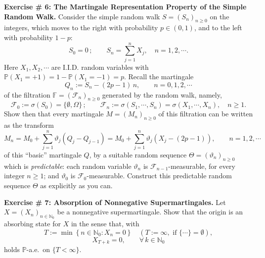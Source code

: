 \textbf{Exercise \# 6: The Martingale Representation Property of the Simple Random Walk.} Consider the simple random walk $S = \left(S_n\right)_{n \geq 0}$ on the integers, which moves to the right with probability $p \in (0,1)$, and to the left with probability $1-p$:
\[
    S_0 = 0\,; \qquad S_n = \sum_{j=1}^{n} X_j, \quad n = 1, 2, \cdots.
\]
Here $X_1, X_2, \cdots$ are I.I.D. random variables with $\mathbb{P}(X_1 = +1) = 1 - \mathbb{P}(X_1 = -1) = p$. Recall the martingale
\[
    Q_n := S_n - (2p-1)\,n, \qquad n = 0, 1, 2, \cdots
\]
of the filtration $\mathbb{F} = \left(\mathcal{F}_n\right)_{n \geq 0}$ generated by the random walk, namely,
\[
    \mathcal{F}_0 := \sigma(S_0) = \{\emptyset, \Omega\}\,; \qquad \mathcal{F}_n := \sigma(S_1, \cdots, S_n) = \sigma(X_1, \cdots, X_n), \quad n \geq 1.
\]
Show then that every martingale $M = \left(M_n\right)_{n \geq 0}$ of this filtration can be written as the transform
\[
    M_n = M_0 + \sum_{j=1}^{n} \vartheta_j\left(Q_j - Q_{j-1}\right) = M_0 + \sum_{j=1}^{n} \vartheta_j\left(X_j - (2p-1)\right), \qquad n = 1, 2, \cdots
\]
of this ``basic'' martingale $Q$, by a suitable random sequence $\Theta = \left(\vartheta_n\right)_{n \geq 0}$ which is \textit{predictable}: each random variable $\vartheta_n$ is $\mathcal{F}_{n-1}$-measurable, for every integer $n \geq 1$; and $\vartheta_0$ is $\mathcal{F}_0$-measurable. Construct this predictable random sequence $\Theta$ as explicitly as you can.

\textbf{Exercise \# 7: Absorption of Nonnegative Supermartingales.} Let $X = \left(X_n\right)_{n \in \mathbb{N}_0}$ be a nonnegative supermartingale. Show that the origin is an absorbing state for $X$ in the sense that, with
\[
    T := \min\left\{n \in \mathbb{N}_0 : X_n = 0\right\} \quad \left(T := \infty, \text{ if } \{\cdots\} = \emptyset\right),
\]
\[
    X_{T+k} = 0, \qquad \forall\, k \in \mathbb{N}_0
\]
holds $\mathbb{P}$-a.e.\ on $\{T < \infty\}$.

